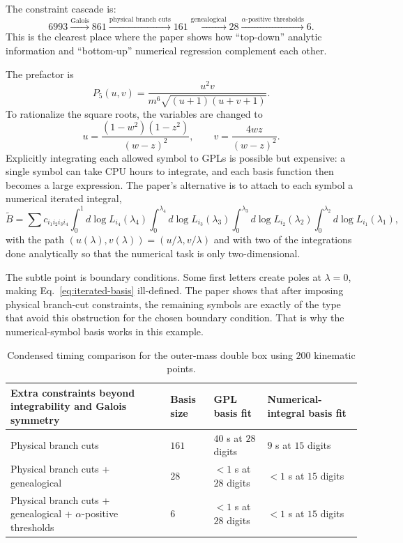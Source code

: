 \documentclass[11pt]{article}
\begin{document}
The constraint cascade is:
\[
6993 \xrightarrow{\text{Galois}} 861
\xrightarrow{\text{physical branch cuts}} 161
\xrightarrow{\text{genealogical}} 28
\xrightarrow{\alpha\text{-positive thresholds}} 6.
\]
This is the clearest place where the paper shows how ``top-down'' analytic information and ``bottom-up'' numerical regression complement each other.

The prefactor is
\[
P_5(u,v)=\frac{u^2v}{m^6\sqrt{(u+1)(u+v+1)}}.
\]
To rationalize the square roots, the variables are changed to
\[
u=\frac{(1-w^2)(1-z^2)}{(w-z)^2},
\qquad
v=\frac{4wz}{(w-z)^2}.
\]
Explicitly integrating each allowed symbol to GPLs is possible but expensive: a single symbol can take CPU hours to integrate, and each basis function then becomes a large expression. The paper's alternative is to attach to each symbol a numerical iterated integral,
\begin{equation}
\widetilde{B}
=
\sum c_{i_1i_2i_3i_4}
\int_0^1 d\log L_{i_4}(\lambda_4)
\int_0^{\lambda_4} d\log L_{i_3}(\lambda_3)
\int_0^{\lambda_3} d\log L_{i_2}(\lambda_2)
\int_0^{\lambda_2} d\log L_{i_1}(\lambda_1),
\label{eq:iterated-basis}
\end{equation}
with the path $(u(\lambda),v(\lambda))=(u/\lambda,v/\lambda)$ and with two of the integrations done analytically so that the numerical task is only two-dimensional.

The subtle point is boundary conditions. Some first letters create poles at $\lambda=0$, making Eq.~\eqref{eq:iterated-basis} ill-defined. The paper shows that after imposing physical branch-cut constraints, the remaining symbols are exactly of the type that avoid this obstruction for the chosen boundary condition. That is why the numerical-symbol basis works in this example.

\begin{table}[ht]
\centering
\small
\begin{tabular}{>{\raggedright\arraybackslash}p{4.7cm} >{\centering\arraybackslash}p{1.4cm} >{\centering\arraybackslash}p{2.8cm} >{\centering\arraybackslash}p{2.8cm}}
\toprule
Extra constraints beyond integrability and Galois symmetry & Basis size & GPL basis fit & Numerical-integral basis fit \\
\midrule
Physical branch cuts & $161$ & $40$ s at $28$ digits & $9$ s at $15$ digits \\
Physical branch cuts + genealogical & $28$ & $<1$ s at $28$ digits & $<1$ s at $15$ digits \\
Physical branch cuts + genealogical + $\alpha$-positive thresholds & $6$ & $<1$ s at $28$ digits & $<1$ s at $15$ digits \\
\bottomrule
\end{tabular}
\caption{Condensed timing comparison for the outer-mass double box using $200$ kinematic points.}
\label{tab:double-box-summary}
\end{table}
\end{document}
